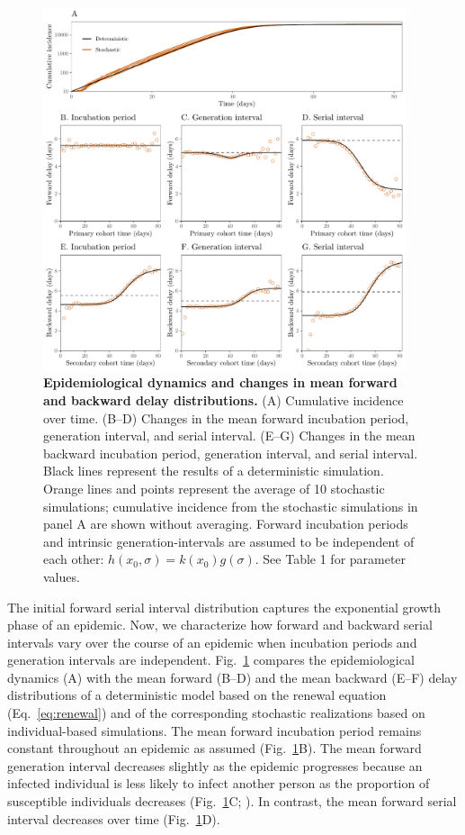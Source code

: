 \documentclass[12pt]{article}
\newcommand{\eref}[1]{Eq.~\ref{eq:#1}}
\newcommand{\fref}[1]{Fig.~\ref{fig:#1}}
\begin{document}
\begin{figure}[!ht]
\begin{center}
\includegraphics[width=0.95\textwidth]{forward.pdf}
\caption{
\textbf{Epidemiological dynamics and changes in mean forward and backward delay distributions.}
(A) Cumulative incidence over time.
(B--D) Changes in the mean forward incubation period, generation interval, and serial interval.
(E--G) Changes in the mean backward incubation period, generation interval, and serial interval.
Black lines represent the results of a deterministic simulation.
Orange lines and points represent the average of 10 stochastic simulations;
cumulative incidence from the stochastic simulations in panel A are shown without averaging.
Forward incubation periods and intrinsic generation-intervals are assumed to be independent of each other: $h(x_0, \sigma) = k(x_0) g(\sigma)$.
See Table 1 for parameter values.
}
\end{center}
\label{fig:epi}
\end{figure}

The initial forward serial interval distribution captures the exponential growth phase of an epidemic.
Now, we characterize how forward and backward serial intervals vary over the course of an epidemic when incubation periods and generation intervals are independent.
\fref{epi} compares the epidemiological dynamics (A) with the mean forward (B--D) and the mean backward (E--F) delay distributions of a deterministic model based on the renewal equation (\eref{renewal}) and of the corresponding stochastic realizations based on individual-based simulations.
The mean forward incubation period remains constant throughout an epidemic as assumed (\fref{epi}B).
The mean forward generation interval decreases slightly as the epidemic progresses because an infected individual is less likely to infect another person as the proportion of susceptible individuals decreases (\fref{epi}C; \cite{kenah2008generation, champredon2015intrinsic}).
In contrast, the mean forward serial interval decreases over time (\fref{epi}D).
\end{document}
